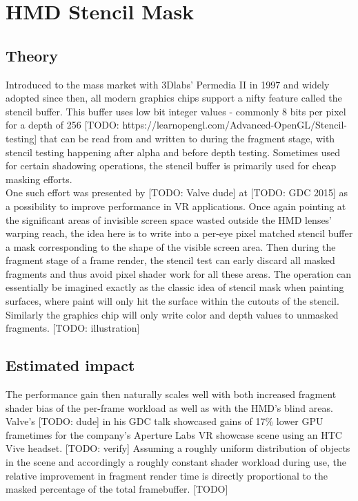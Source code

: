 
\section{HMD Stencil Mask}
\subsection{Theory}
Introduced to the mass market with 3Dlabs' Permedia II in 1997 and widely adopted since then, all modern graphics chips support a nifty feature called the stencil buffer. This buffer uses low bit integer values - commonly 8 bits per pixel for a depth of 256 [TODO: https://learnopengl.com/Advanced-OpenGL/Stencil-testing] that can be read from and written to during the fragment stage, with stencil testing happening after alpha and before depth testing. Sometimes used for certain shadowing operations, the stencil buffer is primarily used for cheap masking efforts. \\
One such effort was presented by [TODO: Valve dude] at [TODO: GDC 2015] as a possibility to improve performance in VR applications. Once again pointing at the significant areas of invisible screen space wasted outside the HMD lenses' warping reach, the idea here is to write into a per-eye pixel matched stencil buffer a mask corresponding to the shape of the visible screen area. Then during the fragment stage of a frame render, the stencil test can early discard all masked fragments and thus avoid pixel shader work for all these areas. The operation can essentially be imagined exactly as the classic idea of stencil mask when painting surfaces, where paint will only hit the surface within the cutouts of the stencil. Similarly the graphics chip will only write color and depth values to unmasked fragments. 
[TODO: illustration]

\subsection{Estimated impact}
The performance gain then naturally scales well with both increased fragment shader bias of the per-frame workload as well as with the HMD's blind areas. Valve's [TODO: dude] in his GDC talk showcased gains of 17\% lower GPU frametimes for the company's Aperture Labs VR showcase scene using an HTC Vive headset. [TODO: verify]
Assuming a roughly uniform distribution of objects in the scene and accordingly a roughly constant shader workload during use, the relative improvement in fragment render time is directly proportional to the masked percentage of the total framebuffer. 
[TODO]

